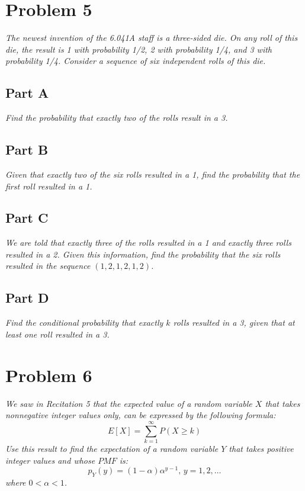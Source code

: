 \documentclass{article}
\begin{document}
\section*{Problem 5}

\textit{The newest invention of the 6.041A staff is a three-sided die. On any
roll of this die, the result is 1 with probability 1/2, 2 with probability
1/4, and 3 with probability 1/4. Consider a sequence of six independent rolls
of this die.}

\subsection*{Part A}

\textit{Find the probability that exactly two of the rolls result in a 3.}

\subsection*{Part B}

\textit{Given that exactly two of the six rolls resulted in a 1, find the
probability that the first roll resulted in a 1.}

\subsection*{Part C}

\textit{We are told that exactly three of the rolls resulted in a 1 and
exactly three rolls resulted in a 2. Given this information, find the
probability that the six rolls resulted in the sequence $ (1, 2, 1, 2, 1, 2)
$.}

\subsection*{Part D}

\textit{Find the conditional probability that exactly $ k $ rolls resulted in
a 3, given that at least one roll resulted in a 3.}

\section*{Problem 6}

\textit{We saw in Recitation 5 that the expected value of a random variable $
X $ that takes nonnegative integer values only, can be expressed by the
following formula:}
$$ E [X] = \sum\limits_{k=1}^{\infty} P(X \geq k) $$
\textit{Use this result to find the expectation of a random variable $ Y $
that takes positive integer values and whose $ PMF $ is:}
$$ p_Y(y) = (1 - \alpha) \alpha^{y - 1},\, y = 1, 2, \ldots $$
\textit{where $ 0 < \alpha < 1 $.}
\end{document}

